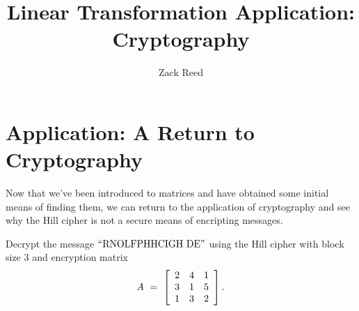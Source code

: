 \documentclass{ximera}
\author{Zack Reed}
\title{Linear Transformation Application: Cryptography}
\begin{document}
\begin{abstract}

\end{abstract}
\maketitle


\section*{Application: A Return to Cryptography}

Now that we've been introduced to matrices and have obtained some initial means of finding them, we can return to the application of cryptography and see why the Hill cipher is not a secure means of encripting messages.

\begin{example}\label{ex:hill-cipher-decryption}
  Decrypt the message $\q{RNOLFPHHCIGH DE}$ using the Hill cipher with
  block size $3$ and encryption matrix
  \begin{equation*}
    A ~=~ \startmat{ccc}
      2 & 4 & 1 \\
      3 & 1 & 5 \\
      1 & 3 & 2 \\
    \stopmat.
  \end{equation*}
\end{example}
\end{document}
